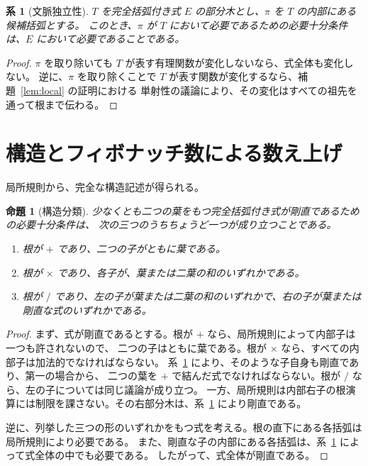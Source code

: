 \documentclass[11pt]{ltjsarticle}
\newtheorem{proposition}[theorem]{命題}
\newtheorem{corollary}[theorem]{系}
\begin{document}
\begin{corollary}[文脈独立性]\label{cor:context}
$T$ を完全括弧付き式 $E$ の部分木とし、$\pi$ を $T$ の内部にある候補括弧とする。
このとき、$\pi$ が $T$ において必要であるための必要十分条件は、$E$ において必要であることである。
\end{corollary}

\begin{proof}
$\pi$ を取り除いても $T$ が表す有理関数が変化しないなら、式全体も変化しない。
逆に、$\pi$ を取り除くことで $T$ が表す関数が変化するなら、補題~\ref{lem:local} の証明における
単射性の議論により、その変化はすべての祖先を通って根まで伝わる。
\end{proof}

\section{構造とフィボナッチ数による数え上げ}

局所規則から、完全な構造記述が得られる。

\begin{proposition}[構造分類]\label{prop:structure}
少なくとも二つの葉をもつ完全括弧付き式が剛直であるための必要十分条件は、
次の三つのうちちょうど一つが成り立つことである。
\begin{enumerate}
\item 根が $+$ であり、二つの子がともに葉である。
\item 根が $\times$ であり、各子が、葉または二葉の和のいずれかである。
\item 根が $/$ であり、左の子が葉または二葉の和のいずれかで、右の子が葉または剛直な式のいずれかである。
\end{enumerate}
\end{proposition}

\begin{proof}
まず、式が剛直であるとする。根が $+$ なら、局所規則によって内部子は一つも許されないので、
二つの子はともに葉である。根が $\times$ なら、すべての内部子は加法的でなければならない。
系~\ref{cor:context} により、そのような子自身も剛直であり、第一の場合から、
二つの葉を $+$ で結んだ式でなければならない。根が $/$ なら、左の子については同じ議論が成り立つ。
一方、局所規則は内部右子の根演算には制限を課さない。その右部分木は、系~\ref{cor:context} により剛直である。

逆に、列挙した三つの形のいずれかをもつ式を考える。根の直下にある各括弧は局所規則により必要である。
また、剛直な子の内部にある各括弧は、系~\ref{cor:context} によって式全体の中でも必要である。
したがって、式全体が剛直である。
\end{proof}
\end{document}
